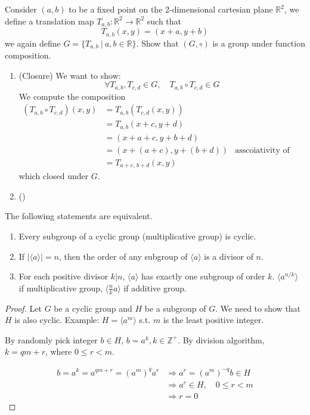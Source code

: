 \begin{example}
    Consider $(a,b)$ to be a fixed point on the 2-dimensional cartesian plane $\mathbb{R}^2$, we define a translation map
    $T_{a,b} : \mathbb{R}^2 \to \mathbb{R}^2$ such that 
    \[
        T_{a,b}(x,y) = (x+a, y+b)
    \]
    we again define $G = \{T_{a,b} \> | \> a, b \in \mathbb{R}\}$. Show that $(G, \circ)$ is a group under function composition.
\end{example}
\begin{solution}
    \begin{enumerate}
        \item (Closure) We want to show:
            \[
                \forall T_{a,b}, T_{c,d} \in G, \quad T_{a,b} \circ T_{c,d} \in G
            \]
        We compute the composition 
        \begin{align*}
            (T_{a,b} \circ T_{c,d})(x,y) &= T_{a,b}(T_{c,d}(x,y))\\
            &= T_{a,b}(x+c, y+d)\\
            &= (x+a+c,y+b+d)\\
            &= (x+(a+c), y+(b+d)) & \text{asscoiativity of ordinary addition}\\
            &= T_{a+c,\, b+d}(x,y)
        \end{align*}
        which closed under $G$.

        \item ()
    \end{enumerate}
\end{solution}

\begin{theorem}
    The following statements are equivalent.

    \begin{enumerate}
        \item Every subgroup of a cyclic group (multiplicative group) is cyclic.
        \item If $|\langle a \rangle| = n$, then the order of any subgroup of $\langle a \rangle$ is a divisor of $n$.
        \item For each positive divisor $k | n$, $\langle a \rangle$ has exactly one subgroup of order $k$. 
        $\langle a^{n/k} \rangle$ if multiplicative group, $\langle \frac{n}{k}a \rangle$ if additive group.
    \end{enumerate}
\end{theorem}
\begin{proof}
    Let $G$ be a cyclic group and $H$ be a subgroup of $G$. We need to show that $H$ is also cyclic.
    Example: $H = \langle a^m \rangle$ s.t. $m$ is the least positive integer.

    By randomly pick integer $b \in H$, $b = a^k, k \in \mathbb{Z}^+$. By division algorithm, $k = qm + r$, where $0 \leq r < m$.

    \begin{align*}
        b = a^k = a^{qm+r} = (a^m)^{q}a^r &\Rightarrow a^r = (a^m)^{-q} b \in H\\
        &\Rightarrow a^r \in H, \quad 0 \leq r < m\\
        &\Rightarrow r = 0
    \end{align*}
\end{proof}

